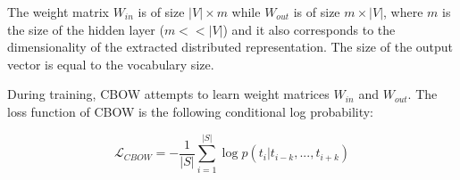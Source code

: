 



The weight matrix $W_{in}$ is of size $|V| \times m$ while $W_{out}$ is of size $m \times |V|$, where $m$ is the size of the hidden layer ($m << |V|$) and it also corresponds to the dimensionality of the extracted distributed representation. The size of the output vector is equal to the vocabulary size. 
%

During training, CBOW attempts to learn weight matrices $W_{in}$ and $W_{out}$. The loss function of CBOW is the following conditional log probability: 

\begin{equation} \label{chap:word_embeddings:eq:CBOW_log_likelihood}
	 \mathcal{L}_{CBOW} = -\frac{1}{|S|} \sum_{i=1}^{|S|}{\log{p(t_{i}|t_{i-k}, ... ,t_{i+k})}}
\end{equation}

